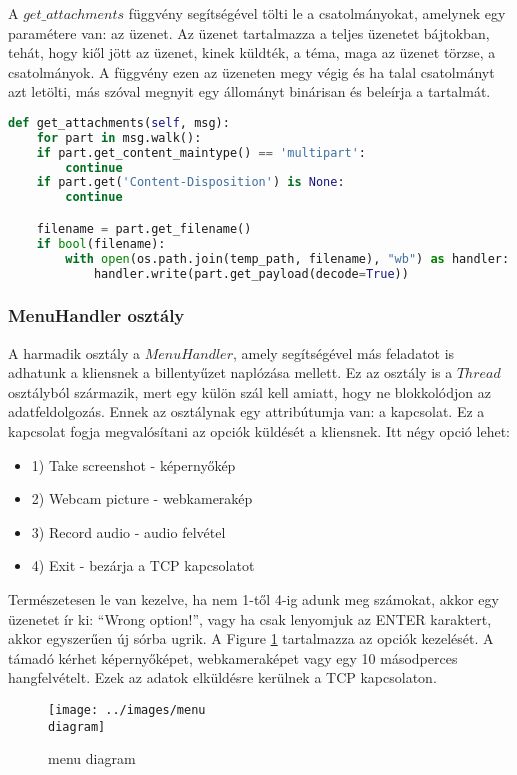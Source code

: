 \documentclass[a4paper, 11pt]{article}
\begin{document}
A $get\_attachments$ függvény segítségével tölti le a csatolmányokat, amelynek egy paramétere van: az üzenet. Az üzenet tartalmazza a teljes üzenetet bájtokban, tehát, hogy kiől jött az üzenet, kinek küldték, a téma, maga az üzenet törzse, a csatolmányok. A függvény ezen az üzeneten megy végig és ha talal csatolmányt azt letölti, más szóval megnyit egy állományt binárisan és beleírja a tartalmát.
\begin{lstlisting}[language=Python]
def get_attachments(self, msg):
	for part in msg.walk():
	if part.get_content_maintype() == 'multipart':
		continue
	if part.get('Content-Disposition') is None:
		continue

	filename = part.get_filename()
	if bool(filename):
		with open(os.path.join(temp_path, filename), "wb") as handler:
			handler.write(part.get_payload(decode=True))
\end{lstlisting}

\subsubsection{MenuHandler osztály}\label{subsubsec:menuhandler}
A harmadik osztály a $MenuHandler$, amely segítségével más feladatot is adhatunk a kliensnek a billentyűzet naplózása mellett. Ez az osztály is a $Thread$ osztályból származik, mert egy külön szál kell amiatt, hogy ne blokkolódjon az adatfeldolgozás. Ennek az osztálynak egy attribútumja van: a kapcsolat. Ez a kapcsolat fogja megvalósítani az opciók küldését a kliensnek. Itt négy opció lehet:
\begin{itemize}
\item 1) Take screenshot - képernyőkép
\item 2) Webcam picture - webkamerakép
\item 3) Record audio - audio felvétel
\item 4) Exit - bezárja a TCP kapcsolatot
\end{itemize}
Természetesen le van kezelve, ha nem 1-től 4-ig adunk meg számokat, akkor egy üzenetet ír ki: ``Wrong option!'', vagy ha csak lenyomjuk az ENTER karaktert, akkor egyszerűen új sórba ugrik. A Figure \ref{fig:menudia} tartalmazza az opciók kezelését. A támadó kérhet képernyőképet, webkameraképet vagy egy 10  másodperces hangfelvételt. Ezek az adatok elküldésre kerülnek a TCP kapcsolaton.
\begin{figure}[H]
\centering
\texttt{[image: ../images/menu\\ diagram]}
\caption{menu diagram}
\label{fig:menudia}
\end{figure}
\end{document}
